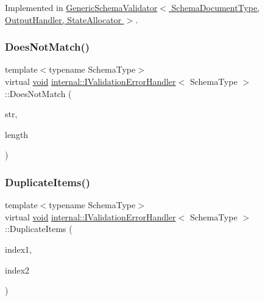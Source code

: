 Implemented in \hyperlink{classGenericSchemaValidator_aa66173c9e71ed6143fa2b35ce777f36a}{Generic\+Schema\+Validator$<$ Schema\+Document\+Type, Output\+Handler, State\+Allocator $>$}.

\mbox{\label{classinternal_1_1IValidationErrorHandler_a9551391add918d6679f9a2a85dffc19c}} 
\subsubsection{\texorpdfstring{Does\+Not\+Match()}{DoesNotMatch()}}
{\footnotesize\ttfamily template$<$typename Schema\+Type$>$ \\
virtual \hyperlink{imgui__impl__opengl3__loader_8h_ac668e7cffd9e2e9cfee428b9b2f34fa7}{void} \hyperlink{classinternal_1_1IValidationErrorHandler}{internal\+::\+I\+Validation\+Error\+Handler}$<$ Schema\+Type $>$\+::Does\+Not\+Match (\begin{DoxyParamCaption}\item[{const \hyperlink{classinternal_1_1IValidationErrorHandler_a22e6a5f35edb9b614156ad606dcc79d7}{Ch} $\ast$}]{str,  }\item[{\hyperlink{rapidjson_8h_a5ed6e6e67250fadbd041127e6386dcb5}{Size\+Type}}]{length }\end{DoxyParamCaption})\hspace{0.3cm}{\ttfamily [pure virtual]}}

\mbox{\label{classinternal_1_1IValidationErrorHandler_a3a0836796f39c946f31f87b80ddd6cf1}} 
\subsubsection{\texorpdfstring{Duplicate\+Items()}{DuplicateItems()}}
{\footnotesize\ttfamily template$<$typename Schema\+Type$>$ \\
virtual \hyperlink{imgui__impl__opengl3__loader_8h_ac668e7cffd9e2e9cfee428b9b2f34fa7}{void} \hyperlink{classinternal_1_1IValidationErrorHandler}{internal\+::\+I\+Validation\+Error\+Handler}$<$ Schema\+Type $>$\+::Duplicate\+Items (\begin{DoxyParamCaption}\item[{\hyperlink{rapidjson_8h_a5ed6e6e67250fadbd041127e6386dcb5}{Size\+Type}}]{index1,  }\item[{\hyperlink{rapidjson_8h_a5ed6e6e67250fadbd041127e6386dcb5}{Size\+Type}}]{index2 }\end{DoxyParamCaption})\hspace{0.3cm}{\ttfamily [pure virtual]}}



